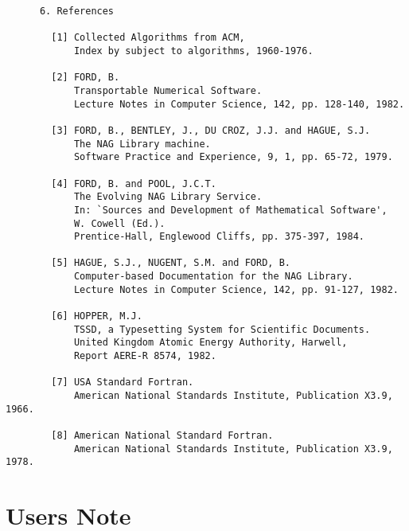 \begin{small}
\begin{verbatim}
      6. References

        [1] Collected Algorithms from ACM,
            Index by subject to algorithms, 1960-1976.

        [2] FORD, B.
            Transportable Numerical Software.
            Lecture Notes in Computer Science, 142, pp. 128-140, 1982.

        [3] FORD, B., BENTLEY, J., DU CROZ, J.J. and HAGUE, S.J.
            The NAG Library machine.
            Software Practice and Experience, 9, 1, pp. 65-72, 1979.

        [4] FORD, B. and POOL, J.C.T.
            The Evolving NAG Library Service.
            In: `Sources and Development of Mathematical Software',
            W. Cowell (Ed.).
            Prentice-Hall, Englewood Cliffs, pp. 375-397, 1984.

        [5] HAGUE, S.J., NUGENT, S.M. and FORD, B.
            Computer-based Documentation for the NAG Library.
            Lecture Notes in Computer Science, 142, pp. 91-127, 1982.

        [6] HOPPER, M.J.
            TSSD, a Typesetting System for Scientific Documents.
            United Kingdom Atomic Energy Authority, Harwell,
            Report AERE-R 8574, 1982.

        [7] USA Standard Fortran.
            American National Standards Institute, Publication X3.9, 1966.

        [8] American National Standard Fortran.
            American National Standards Institute, Publication X3.9, 1978.
\end{verbatim}
\end{small}

\newpage
\section{Users Note}
\label{se:usern}

